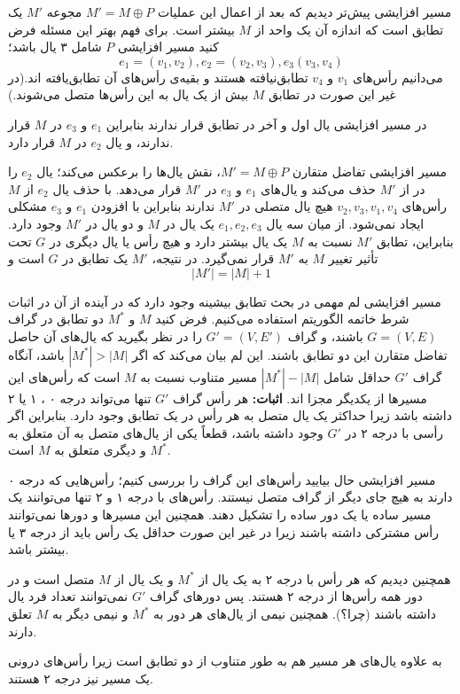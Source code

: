 \begin{itemframe}{مسیر افزایشی}
\itm
پیش‌تر دیدیم که بعد از اعمال این عملیات
$M' = M \oplus P$
مجوعه $M' $ یک تطابق است که اندازه آن یک واحد از $M$ بیشتر است.
\itm
برای فهم بهتر این مسئله  فرض کنید مسیر افزایشی $P$ شامل ۳ یال باشد؛
$$ e_1=(v_1, v_2), e_2=(v_2, v_3), e_3(v_3, v_4)$$
می‌دانیم رأس‌های
$v_1$ و
$v_4$
تطابق‌نیافته هستند و بقیه‌ی رأس‌های آن تطابق‌یافته ‌اند.(در غیر این ‌صورت در تطابق $M$ بیش از یک یال به این رأس‌ها
متصل می‌شوند.)

\itm
در مسیر افزایشی یال اول و آخر در تطابق قرار ندارند بنابراین
$e_1$ و
$e_3$
در $M$ قرار ندارند، و یال
$e_2$
در $M$ قرار دارد.
\end{itemframe}


\begin{itemframe}{مسیر افزایشی}
\itm
تفاضل متقارن $M' = M \oplus P$، نقش یال‌ها را برعکس می‌کند؛ یال
$e_2$
را در از $M'$ حذف می‌کند و یال‌های
$e_1$ و
$e_3$
در $M'$ قرار می‌دهد.
\itm
با حذف یال
$e_2$
از $M$ رأس‌های
$v_2, v_3, v_1, v_4$
هیچ یال متصلی در $M'$  ندارند بنابراین با افزودن
$e_1$ و
$e_3$
مشکلی ایجاد نمی‌شود.
\itm
از میان سه یال
$e_1, e_2, e_3$
یک یال در $M$ و دو یال در $M'$ وجود دارد. بنابراین، تطابق $M'$ نسبت به $M$ یک یال بیشتر دارد و هیچ رأس یا یال دیگری در $G$ تحت تأثیر تغییر $M$ به $M'$ قرار نمی‌گیرد.
\itm
در نتیجه، $M'$ یک تطابق در $G$ است و
$$|M'| = |M| + 1$$

\end{itemframe}


\begin{itemframe}{مسیر افزایشی}
\itm
لم مهمی در بحث تطابق بیشینه وجود دارد که در آینده از آن در اثبات شرط خاتمه الگوریتم استفاده می‌کنیم.
\itm
فرض کنید
$M$ و
$M^*$
دو تطابق در گراف
$G = (V, E)$
 باشند، و گراف
$G' = (V, E')$
را در نظر بگیرید که یال‌های آن حاصل تفاضل متقارن این دو تطابق باشند. این لم بیان می‌کند که  اگر
$|M^*| > |M|$
باشد، آنگاه گراف $G'$ حداقل شامل $|M^*| - |M|$ مسیر متناوب نسبت به $M$ است که رأس‌های این مسیرها از یکدیگر مجزا اند.
\itm
\textbf{اثبات:}
هر رأس گراف $G'$ تنها می‌تواند درجه ۰ ، ۱ یا ۲ داشته باشد زیرا حداکثر یک یال متصل به هر رأس در یک تطابق وجود دارد. بنابراین اگر رأسی با درجه ۲ در  $G'$ وجود داشته باشد، قطعاً یکی از یال‌های متصل به آن متعلق به $M^*$ و دیگری متعلق به $M$ است.
\end{itemframe}


\begin{itemframe}{مسیر افزایشی}
\itm
حال بیایید رأس‌های این گراف را بررسی کنیم؛ رأس‌هایی که درجه ۰ دارند به هیچ جای دیگر از گراف متصل نیستند. رأس‌های با درجه ۱ و ۲ تنها می‌توانند یک مسیر ساده یا یک دور ساده را تشکیل دهند. همچنین این مسیرها و دور‌ها نمی‌توانند رأس مشترکی داشته باشند زیرا در غیر این صورت حداقل یک رأس باید از درجه ۳ یا بیشتر باشد.

\itm
همچنین دیدیم که هر رأس با درجه ۲ به یک یال از $M^*$ و یک یال از $M$ متصل است و در دور همه رأس‌ها از درجه ۲ هستند. پس دورهای گراف $G'$ نمی‌توانند تعداد فرد یال داشته باشند (چرا؟). همچنین نیمی از یال‌های هر دور به $M^*$ و نیمی دیگر به $M$ تعلق دارند.

\itm
به علاوه یال‌های هر مسیر هم به طور متناوب از دو تطابق است زیرا رأس‌های درونی یک مسیر نیز درجه ۲ هستند.

\end{itemframe}


